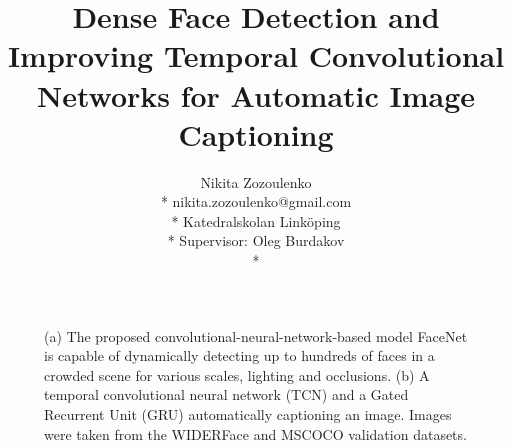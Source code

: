 \documentclass[a4paper, twoside]{article}
\title{Dense Face Detection and Improving Temporal Convolutional Networks for Automatic Image Captioning}
\author{Nikita Zozoulenko \\*
nikita.zozoulenko@gmail.com \\*
Katedralskolan Linköping\\*
Supervisor: Oleg Burdakov \\*}
\begin{document}
\maketitle
\thispagestyle{empty}

\vfill
\begin{figure}[h]
    \centering
  	\caption{(a) The proposed convolutional-neural-network-based model FaceNet is capable of dynamically detecting up to hundreds of faces in a crowded scene for various scales, lighting and occlusions. (b) A temporal convolutional neural network (TCN) and a Gated Recurrent Unit (GRU) automatically captioning an image. Images were taken from the WIDERFace \cite{WIDERFace} and MSCOCO \cite{mscoco} validation datasets.} \label{figtitle}
\end{figure}
\vfill
\end{document}
